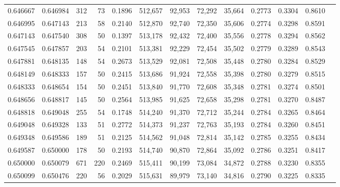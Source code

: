 \begin{tabular}{rrrrrrrrrrrrr}
0.646667 & 0.646984 &    312 &    73 &                                     0.1896 & 512,657 &  92,953 &  72,292 &  35,664 & 0.2773 & 0.3304 & 0.8610 \\
0.646995 & 0.647143 &    213 &    58 &                                     0.2140 & 512,870 &  92,740 &  72,350 &  35,606 & 0.2774 & 0.3298 & 0.8591 \\
0.647143 & 0.647540 &    308 &    50 &                                     0.1397 & 513,178 &  92,432 &  72,400 &  35,556 & 0.2778 & 0.3294 & 0.8562 \\
0.647545 & 0.647857 &    203 &    54 &                                     0.2101 & 513,381 &  92,229 &  72,454 &  35,502 & 0.2779 & 0.3289 & 0.8543 \\
0.647881 & 0.648135 &    148 &    54 &                                     0.2673 & 513,529 &  92,081 &  72,508 &  35,448 & 0.2780 & 0.3284 & 0.8529 \\
0.648149 & 0.648333 &    157 &    50 &                                     0.2415 & 513,686 &  91,924 &  72,558 &  35,398 & 0.2780 & 0.3279 & 0.8515 \\
0.648333 & 0.648654 &    154 &    50 &                                     0.2451 & 513,840 &  91,770 &  72,608 &  35,348 & 0.2781 & 0.3274 & 0.8501 \\
0.648656 & 0.648817 &    145 &    50 &                                     0.2564 & 513,985 &  91,625 &  72,658 &  35,298 & 0.2781 & 0.3270 & 0.8487 \\
0.648818 & 0.649048 &    255 &    54 &                                     0.1748 & 514,240 &  91,370 &  72,712 &  35,244 & 0.2784 & 0.3265 & 0.8464 \\
0.649048 & 0.649328 &    133 &    51 &                                     0.2772 & 514,373 &  91,237 &  72,763 &  35,193 & 0.2784 & 0.3260 & 0.8451 \\
0.649348 & 0.649586 &    189 &    51 &                                     0.2125 & 514,562 &  91,048 &  72,814 &  35,142 & 0.2785 & 0.3255 & 0.8434 \\
0.649587 & 0.650000 &    178 &    50 &                                     0.2193 & 514,740 &  90,870 &  72,864 &  35,092 & 0.2786 & 0.3251 & 0.8417 \\
0.650000 & 0.650079 &    671 &   220 &                                     0.2469 & 515,411 &  90,199 &  73,084 &  34,872 & 0.2788 & 0.3230 & 0.8355 \\
0.650099 & 0.650476 &    220 &    56 &                                     0.2029 & 515,631 &  89,979 &  73,140 &  34,816 & 0.2790 & 0.3225 & 0.8335 \\

\end{tabular}
